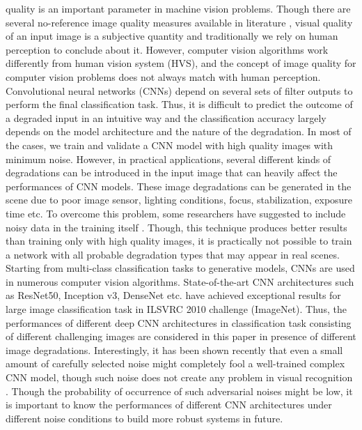 \documentclass[10pt, journal, compsoc]{IEEEtran}
\begin{document}
\maketitle

 quality is an important parameter in machine vision problems. Though there are several no-reference image quality measures available in literature \cite{mittal2012no}, visual quality of an input image is a subjective quantity and traditionally we rely on human perception to conclude about it. However, computer vision algorithms work differently from human vision system (HVS), and the concept of image quality for computer vision problems does not always match with human perception. Convolutional neural networks (CNNs) depend on several sets of filter outputs to perform the final classification task. Thus, it is difficult to predict the outcome of a degraded input in an intuitive way and the classification accuracy largely depends on the model architecture and the nature of the degradation. In most of the cases, we train and validate a CNN model with high quality images with minimum noise. However, in practical applications, several different kinds of degradations can be introduced in the input image that can heavily affect the performances of CNN models. These image degradations can be generated in the scene due to poor image sensor, lighting conditions, focus, stabilization, exposure time etc. To overcome this problem, some researchers have suggested to include noisy data in the training itself \cite{dodge2016understanding}. Though, this technique produces better results than training only with high quality images, it is practically not possible to train a network with all probable degradation types that may appear in real scenes. Starting from multi-class classification tasks to generative models, CNNs are used in numerous computer vision algorithms. State-of-the-art CNN architectures such as ResNet50, Inception v3, DenseNet etc. \cite{howard2017mobilenets, simonyan2014very, he2016deep} have achieved exceptional results for large image classification task in ILSVRC 2010 challenge (ImageNet). Thus, the performances of different deep CNN architectures in classification task consisting of different challenging images are considered in this paper in presence of different image degradations. Interestingly, it has been shown recently that even a small amount of carefully selected noise might completely fool a well-trained complex CNN model, though such noise does not create any problem in visual recognition \cite{moosavi2016deepfool}. Though the probability of occurrence of such adversarial noises might be low, it is important to know the performances of different CNN architectures under different noise conditions to build more robust systems in future.
\end{document}
